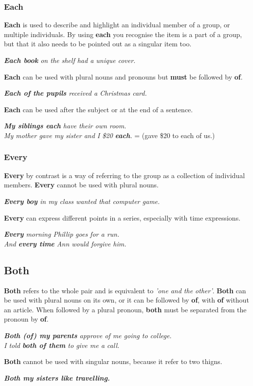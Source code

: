 \documentclass[10pt,a4paper]{article}
\begin{document}
\subsubsection{Each}
\textbf{Each} is used to describe and highlight an individual member of a group, or multiple individuals. By using \textbf{each} you recognise the item is a part of a group, but that it also needs to be pointed out as a singular item too.
\begin{center}
\textit{ \textbf{Each book} on the shelf had a unique cover.}
\end{center}
\textbf{Each} can be used with plural nouns and pronouns but \textbf{must} be followed by \textbf{of}.
\begin{center}
\textit{ \textbf{Each of the pupils} received a Christmas card.}
\end{center}
\textbf{Each} can be used after the subject or at the end of a sentence.
\begin{center}
\textit{ \textbf{My siblings each} have their own room.\\
My mother gave my sister and I \$20 \textbf{each}.} = (gave \$20 to each of us.)
\end{center}
\subsubsection{Every}
\textbf{Every} by contrast is a way of referring to the group as a collection of individual members. \textbf{Every} cannot be used with plural nouns.
\begin{center}
\textit{  \textbf{Every boy} in my class wanted that computer game.}
\end{center}
\textbf{Every} can express different points in a series, especially with time expressions.
\begin{center}
\textit{ \textbf{Every} morning Phillip goes for a run.\\
And \textbf{every time} Ann would forgive him.}
\end{center}

\subsection{Both}
\textbf{Both} refers to the whole pair and is equivalent to \textit{'one and the other'}. \textbf{Both} can be used with plural nouns on its own, or it can be followed by \textbf{of}, with \textbf{of} without an article. When followed by a plural pronoun, \textbf{both} must be separated from the pronoun by \textbf{of}.
\begin{center}
		\textit{ \textbf{Both (of) my parents} approve of me going to college.\\
		I told \textbf{both of them} to give me a call.}
\end{center}
\textbf{Both} cannot be used with singular nouns, because it refer to two thigns.
\begin{center}
\textit{  \textbf{Both my sisters like travelling.}}
\end{center}
\end{document}
